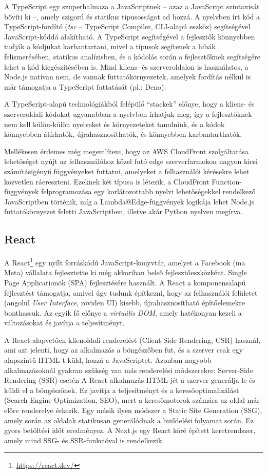 A TypeScript egy szuperhalmaza a JavaScriptnek -- azaz a JavaScript szintaxisát bővíti ki --, amely szigorú és statikus típusosságot ad hozzá. A nyelvben írt kód a TypeScript-fordító (\emph{tsc} -- TypeScript Compiler, CLI-alapú eszköz) segítségével JavaScript-kóddá alakítható. A TypeScript segítségével a fejlesztők könnyebben tudják a kódjukat karbantartani, mivel a típusok segítenek a hibák felismerésében, statikus analízisben, és a kódolás során a fejlesztőknek segítségére lehet a kód kiegészítésében is. Mind kliens- és szerveroldalon is használatos, a Node.js natívan nem, de vannak futtatókörnyezetek, amelyek fordítás nélkül is már támogatja a TypeScript futtatását (pl.: Deno).

A TypeScript-alapú technológiákból felépülő ``stackek'' előnye, hogy a kliens- és szerveroldali kódokat ugyanabban a nyelvben írhatjuk meg, így a fejlesztőknek nem kell külön-külön nyelveket és környezeteket tanulniuk, és a kódok könnyebben átírhatók, újrahasznosíthatók, és könnyebben karbantarthatók.

Mellékesen érdemes még megemlíteni, hogy az AWS CloudFront szolgáltatása lehetőséget nyújt az felhasználóhoz közel futó edge szerverfarmokon nagyon kicsi számításigényű függvényeket futtatni, amelyeket a felhasználói kérésekre lehet közvetlen ráereszteni. Ezeknek két típusa is létezik, a CloudFront Function-függvények felprogramozása egy korlátozottabb nyelvi lehetőségekkel rendelkező JavaScriptben történik, míg a Lambda@Edge-függvények logikája lehet Node.js futtatókörnyezet feletti JavaScriptben, illetve akár Python nyelven megírva.

\subsection{React}

A React\footnote{\url{https://react.dev/}} egy nyílt forráskódú JavaScript-könyvtár, amelyet a Facebook (ma Meta) vállalata fejlesztette ki még akkoriban belső fejlesztőeszközként. Single Page Applicationök (SPA) fejlesztésére használt. A React a komponensalapú fejlesztést támogatja, amivel úgy tudunk építkezni, hogy az felhasználói felületet (angolul \emph{User Interface}, röviden UI) kisebb, újrahasznosítható építőelemekre bonthassuk. Az egyik fő előnye a \emph{virtuális DOM}, amely hatékonyan kezeli a változásokat és javítja a teljesítményt.

A React alapvetően klienoldali renderelést (Client-Side Rendering, CSR) használ, ami azt jelenti, hogy az alkalmazás a böngészőben fut, és a szerver csak egy alapszintű HTML-t küld, hozzá a JavaScriptet. Azonban nagyobb alkalmazásoknál gyakran szükség van más renderelési módszerekre: Server-Side Rendering (SSR) esetén A React alkalmazás HTML-jét a szerver generálja le és küldi el a böngészőnek. Ez javítja a teljesítményt és a keresőoptimalizálást (Search Engine Optimization, SEO), mert a keresőmotorok számára az oldal már előre renderelve érkezik. Egy másik ilyen módszer a Static Site Generation (SSG), amely során az oldalak statikusan generálódnak a buildelési folyamat során. Ez gyors betöltési időt eredményez. A Next.js egy React köré épített keretrendszer, amely mind SSG- és SSR-funkcióval is rendelkezik.

